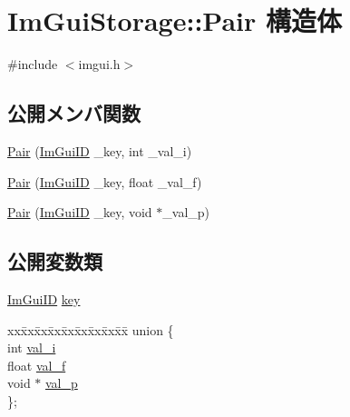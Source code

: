 \hypertarget{struct_im_gui_storage_1_1_pair}{}\section{Im\+Gui\+Storage\+:\+:Pair 構造体}
\label{struct_im_gui_storage_1_1_pair}


{\ttfamily \#include $<$imgui.\+h$>$}

\subsection*{公開メンバ関数}
\begin{DoxyCompactItemize}
\item 
\mbox{\hyperlink{struct_im_gui_storage_1_1_pair_a37542a22048f0af35e5a6beda6900a0e}{Pair}} (\mbox{\hyperlink{imgui_8h_a1785c9b6f4e16406764a85f32582236f}{Im\+Gui\+ID}} \+\_\+key, int \+\_\+val\+\_\+i)
\item 
\mbox{\hyperlink{struct_im_gui_storage_1_1_pair_a6f63f598513f2a7a57f2e9ea3b0137b9}{Pair}} (\mbox{\hyperlink{imgui_8h_a1785c9b6f4e16406764a85f32582236f}{Im\+Gui\+ID}} \+\_\+key, float \+\_\+val\+\_\+f)
\item 
\mbox{\hyperlink{struct_im_gui_storage_1_1_pair_a4d07d60f83b4e24ee8be9ccceaab76bd}{Pair}} (\mbox{\hyperlink{imgui_8h_a1785c9b6f4e16406764a85f32582236f}{Im\+Gui\+ID}} \+\_\+key, void $\ast$\+\_\+val\+\_\+p)
\end{DoxyCompactItemize}
\subsection*{公開変数類}
\begin{DoxyCompactItemize}
\item 
\mbox{\hyperlink{imgui_8h_a1785c9b6f4e16406764a85f32582236f}{Im\+Gui\+ID}} \mbox{\hyperlink{struct_im_gui_storage_1_1_pair_a5b37b692d2eacc7f4f5b6f233359e6ce}{key}}
\item 
\begin{tabbing}
xx\=xx\=xx\=xx\=xx\=xx\=xx\=xx\=xx\=\kill
union \{\\
\>int \mbox{\hyperlink{struct_im_gui_storage_1_1_pair_ad6d89ae042ab3e6db8b1e1cf47b05c5e}{val\_i}}\\
\>float \mbox{\hyperlink{struct_im_gui_storage_1_1_pair_adf93d369480896f4d4b6dbf707de7bc8}{val\_f}}\\
\>void $\ast$ \mbox{\hyperlink{struct_im_gui_storage_1_1_pair_ac678b2f593c5de682b84ef41e9f30b06}{val\_p}}\\
\}; \\

\end{tabbing}\end{DoxyCompactItemize}


